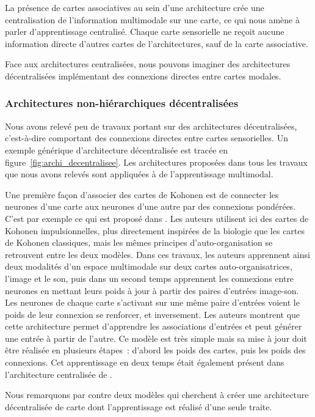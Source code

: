 \documentclass[../main]{subfiles}
\begin{document}
La présence de cartes associatives au sein d'une architecture crée une centralisation de l'information multimodale sur une carte, ce qui nous amène à parler d'apprentissage centralisé. Chaque carte sensorielle ne reçoit aucune information directe d'autres cartes de l'architectures, sauf de la carte associative.

Face aux architectures centralisées, nous pouvons imaginer des architectures décentralisées implémentant des connexions directes entre cartes modales.

\subsubsection{Architectures non-hiérarchiques décentralisées}

Nous avons relevé peu de travaux portant sur des architectures décentralisées, c'est-à-dire comportant des connexions directes entre cartes sensorielles. Un exemple générique d'architecture décentralisée est tracée en figure~\ref{fig:archi_decentralisee}. Les architectures proposées dans tous les travaux que nous avons relevés sont appliquées à de l'apprentissage multimodal.

Une première façon d'associer des cartes de Kohonen est de connecter les neurones d'une carte aux neurones d'une autre par des connexions pondérées. C'est par exemple ce qui est proposé dans \cite{khacef_brain-inspired_2020}. Les auteurs utilisent ici des cartes de Kohonen impulsionnelles, plus directement inspirées de la biologie que les cartes de Kohonen classiques, mais les mêmes principes d'auto-organisation se retrouvent entre les deux modèles. Dans ces travaux, les auteurs apprennent ainsi deux modalités d'un espace multimodale sur deux cartes auto-organisatrices, l'image et le son, puis dans un second temps apprennent les connexions entre neurones en mettant leurs poids à jour à partir des paires d'entrées image-son. Les neurones de chaque carte s'activant sur une même paire d'entrées voient le poids de leur connexion se renforcer, et inversement.
Les auteurs montrent que cette architecture permet d'apprendre les associations d'entrées et peut générer une entrée à partir de l'autre. 
Ce modèle est très simple mais sa mise à jour doit être réalisée en plusieurs étapes~: d'abord les poids des cartes, puis les poids des connexions. Cet apprentissage en deux temps était également présent dans l'architecture centralisée de \cite{dominey13}.

Nous remarquons par contre deux modèles qui cherchent à créer une architecture décentralisée de carte dont l'apprentissage est réalisé d'une seule traite. 
\end{document}
